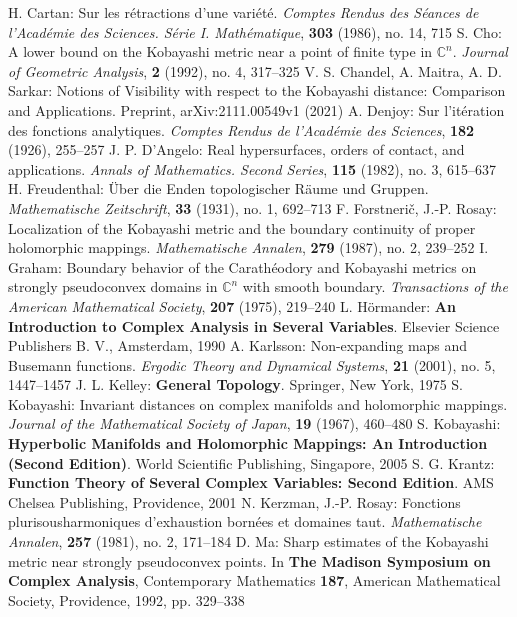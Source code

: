 \begin{thebibliography}{widest entry}
   H. Cartan: Sur les rétractions d'une variété. \textit{Comptes Rendus des Séances de l'Académie des Sciences. Série I. Mathématique}, \textbf{303} (1986), no. 14, 715
   S. Cho: A lower bound on the Kobayashi metric near a point of finite type in $\mathbb{C}^n$. \textit{Journal of Geometric Analysis}, \textbf{2} (1992), no. 4, 317--325
   V. S. Chandel, A. Maitra, A. D. Sarkar: Notions of Visibility with respect to the Kobayashi distance: Comparison and Applications. Preprint, arXiv:2111.00549v1 (2021)
   A. Denjoy: Sur l'itération des fonctions analytiques. \textit{Comptes Rendus de l'Académie des Sciences}, \textbf{182} (1926), 255--257
   J. P. D'Angelo: Real hypersurfaces, orders of contact, and applications. \textit{Annals of Mathematics. Second Series}, \textbf{115} (1982), no. 3, 615--637
   H. Freudenthal: Über die Enden topologischer Räume und Gruppen. \textit{Mathematische Zeitschrift}, \textbf{33} (1931), no. 1, 692--713
   F. Forstnerič, J.-P. Rosay: Localization of the Kobayashi metric and the boundary continuity of proper holomorphic mappings. \textit{Mathematische Annalen}, \textbf{279} (1987), no. 2, 239--252
   I. Graham: Boundary behavior of the Carathéodory and Kobayashi metrics on strongly pseudoconvex domains in $\mathbb{C}^n$ with smooth boundary. \textit{Transactions of the American Mathematical Society}, \textbf{207} (1975), 219--240
   L. Hörmander: \textbf{An Introduction to Complex Analysis in Several Variables}. Elsevier Science Publishers B. V., Amsterdam, 1990
   A. Karlsson: Non-expanding maps and Busemann functions. \textit{Ergodic Theory and Dynamical Systems}, \textbf{21} (2001), no. 5, 1447--1457
   J. L. Kelley: \textbf{General Topology}. Springer, New York, 1975
   S. Kobayashi: Invariant distances on complex manifolds and holomorphic mappings. \textit{Journal of the Mathematical Society of Japan}, \textbf{19} (1967), 460--480
   S. Kobayashi: \textbf{Hyperbolic Manifolds and Holomorphic Mappings: An Introduction (Second Edition)}. World Scientific Publishing, Singapore, 2005
   S. G. Krantz: \textbf{Function Theory of Several Complex Variables: Second Edition}. AMS Chelsea Publishing, Providence, 2001
   N. Kerzman, J.-P. Rosay: Fonctions plurisousharmoniques d'exhaustion bornées et domaines taut. \textit{Mathematische Annalen}, \textbf{257} (1981), no. 2, 171--184
   D. Ma: Sharp estimates of the Kobayashi metric near strongly pseudoconvex points. In \textbf{The Madison Symposium on Complex Analysis}, Contemporary Mathematics \textbf{187}, American Mathematical Society, Providence, 1992, pp. 329--338

\end{thebibliography}
